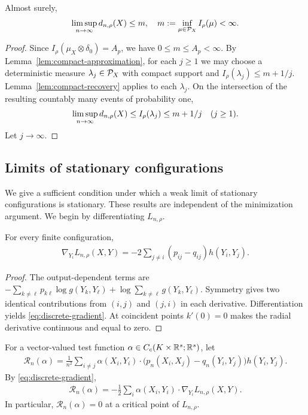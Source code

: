 \begin{proposition}\label{prop:limsup}
Almost surely,
\begin{align}\label{eq:limsup}
\limsup_{n\to\infty}d_{n,\rho}(X)\leq m,
\quad m:=\inf_{\mu\in\mathcal P_X}I_\rho(\mu)<\infty.
\end{align}
\end{proposition}
\begin{proof}
Since $I_\rho(\mu_X\otimes\delta_0)=A_p$, we have $0\leq m\leq A_p<\infty$. By Lemma~\ref{lem:compact-approximation}, for each $j\geq1$ we may choose a deterministic measure $\lambda_j\in\mathcal P_X$ with compact support and $I_\rho(\lambda_j)\leq m+1/j$. Lemma~\ref{lem:compact-recovery} applies to each $\lambda_j$. On the intersection of the resulting countably many events of probability one,
\begin{align}
\limsup_{n\to\infty}d_{n,\rho}(X)\leq I_\rho(\lambda_j)\leq m+1/j
\quad(j\geq1).\notag
\end{align}
Let $j\to\infty$.
\end{proof}
\subsection{Limits of stationary configurations}\label{sec:auxiliary}
We give a sufficient condition under which a weak limit of stationary configurations is stationary. These results are independent of the minimization argument. We begin by differentiating $L_{n,\rho}$.
\begin{lemma}\label{lem:gradient}
For every finite configuration,
\begin{align}\label{eq:discrete-gradient}
\nabla_{Y_i}L_{n,\rho}(X,Y)
=-2\sum_{j\ne i}(p_{ij}-q_{ij})h(Y_i,Y_j).
\end{align}
\end{lemma}
\begin{proof}
The output-dependent terms are
$-\sum_{k\ne\ell}p_{k\ell}\log g(Y_k,Y_\ell)+\log\sum_{k\ne\ell}g(Y_k,Y_\ell)$.
Symmetry gives two identical contributions from $(i,j)$ and $(j,i)$ in each derivative. Differentiation yields \eqref{eq:discrete-gradient}. At coincident points $k'(0)=0$ makes the radial derivative continuous and equal to zero.
\end{proof}
For a vector-valued test function $\alpha\in C_c(K\times\mathbb{R}^s;\mathbb{R}^s)$, let
\begin{align}\label{eq:stationarity-residual}
\mathcal R_n(\alpha)=\frac1{n^2}\sum_{i\ne j}\alpha(X_i,Y_i)\cdot
\bigl(p_n(X_i,X_j)-q_n(Y_i,Y_j)\bigr)h(Y_i,Y_j).
\end{align}
By \eqref{eq:discrete-gradient},
\begin{align}\label{eq:residual-gradient-identity}
\mathcal R_n(\alpha)=-\frac12\sum_i\alpha(X_i,Y_i)\mathbin{\cdot}
\nabla_{Y_i}L_{n,\rho}(X,Y).
\end{align}
In particular, $\mathcal R_n(\alpha)=0$ at a critical point of $L_{n,\rho}$.

